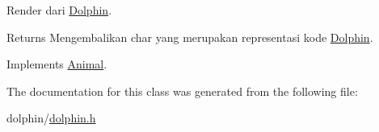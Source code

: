 Render dari \hyperlink{classDolphin}{Dolphin}. 

\begin{DoxyReturn}{Returns}
Mengembalikan char yang merupakan representasi kode \hyperlink{classDolphin}{Dolphin}. 
\end{DoxyReturn}


Implements \hyperlink{classAnimal_a43a47c0f41d211128e04abc6add53def}{Animal}.



The documentation for this class was generated from the following file\+:\begin{DoxyCompactItemize}
\item 
dolphin/\hyperlink{dolphin_8h}{dolphin.\+h}\end{DoxyCompactItemize}
